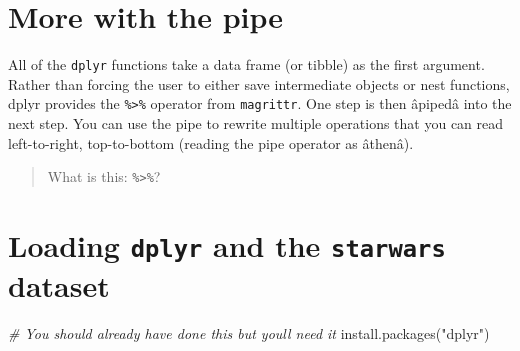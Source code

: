 \documentclass[
]{book}
\newenvironment{Shaded}{\begin{snugshade}}{\end{snugshade}}
\newcommand{\CommentTok}[1]{\textcolor[rgb]{0.56,0.35,0.01}{\textit{#1}}}
\newcommand{\FunctionTok}[1]{\textcolor[rgb]{0.00,0.00,0.00}{#1}}
\newcommand{\NormalTok}[1]{#1}
\newcommand{\StringTok}[1]{\textcolor[rgb]{0.31,0.60,0.02}{#1}}
\begin{document}
\hypertarget{more-with-the-pipe}{%
\section{More with the pipe}\label{more-with-the-pipe}}

All of the \texttt{dplyr} functions take a data frame (or tibble) as the first argument. Rather than forcing the user to either save intermediate objects or nest functions, dplyr provides the \texttt{\%\textgreater{}\%} operator from \texttt{magrittr}. One step is then âpipedâ into the next step. You can use the pipe to rewrite multiple operations that you can read left-to-right, top-to-bottom (reading the pipe operator as âthenâ).

\begin{quote}
What is this: \texttt{\%\textgreater{}\%}?
\end{quote}

\hypertarget{loading-dplyr-and-the-starwars-dataset}{%
\section{\texorpdfstring{Loading \texttt{dplyr} and the \texttt{starwars} dataset}{Loading dplyr and the starwars dataset}}\label{loading-dplyr-and-the-starwars-dataset}}

\begin{Shaded}
\begin{Highlighting}[]
\CommentTok{\# You should already have done this but you\textquotesingle{}ll need it}
\FunctionTok{install.packages}\NormalTok{(}\StringTok{"dplyr"}\NormalTok{)}
\end{Highlighting}
\end{Shaded}
\end{document}

